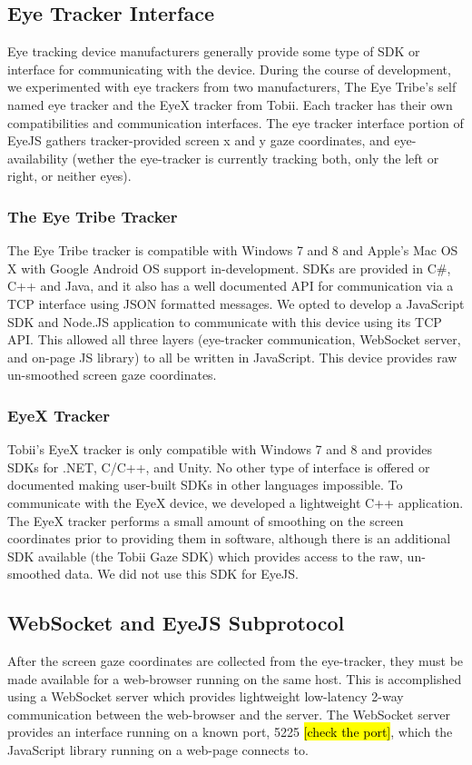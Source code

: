 \documentclass{sigchi}
\begin{document}
\subsection{Eye Tracker Interface}
Eye tracking device manufacturers generally provide some type of SDK or
interface for communicating with the device. During the course of
development, we experimented with eye trackers from two manufacturers,
The Eye Tribe's self named eye tracker and the EyeX tracker from Tobii.
Each tracker has their own compatibilities and communication interfaces.
The eye tracker interface portion of EyeJS gathers tracker-provided
screen x and y gaze coordinates, and eye-availability (wether the
eye-tracker is currently tracking both, only the left or right, or
neither eyes).

\subsubsection{The Eye Tribe Tracker}
The Eye Tribe tracker is compatible with Windows 7 and 8 and Apple's Mac
OS X with Google Android OS support in-development. SDKs are provided
in C\#, C++ and Java, and it also has a well documented API for
communication via a TCP interface using JSON formatted messages. We
opted to develop a JavaScript SDK and Node.JS application to communicate
with this device using its TCP API. This allowed all three layers
(eye-tracker communication, WebSocket server, and on-page JS library)
to all be written in JavaScript. This device provides raw un-smoothed
screen gaze coordinates.

\subsubsection{EyeX Tracker}
Tobii's EyeX tracker is only compatible with Windows 7 and 8 and provides
SDKs for .NET, C/C++, and Unity. No other type of interface is offered
or documented making user-built SDKs in other languages impossible. To communicate with the EyeX device, we developed a lightweight C++
application. The EyeX tracker performs a small amount of smoothing on the
screen coordinates prior to providing them in software, although there
is an additional SDK available (the Tobii Gaze SDK) which provides access
to the raw, un-smoothed data. We did not use this SDK for EyeJS.


\subsection{WebSocket and EyeJS Subprotocol}
After the screen gaze coordinates are collected from the eye-tracker,
they must be made available for a web-browser running on the same host.
This is accomplished using a WebSocket server which provides lightweight
low-latency 2-way communication between the web-browser and the server.
The WebSocket server provides an interface running on a known port, 5225 \hl{[check the port]}, which the JavaScript library running on a web-page
connects to.
\end{document}
